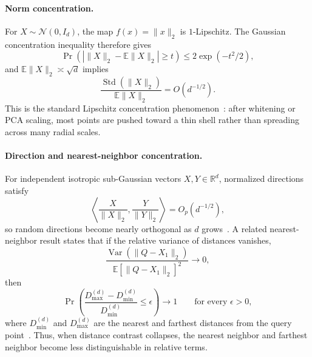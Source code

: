 \paragraph{Norm concentration.}
For \(X\sim\mathcal{N}(0,I_d)\), the map \(f(x)=\|x\|_2\) is \(1\)-Lipschitz. The Gaussian concentration inequality therefore gives
\begin{equation}
  \Pr\!\left(\left|\|X\|_2-\mathbb{E}\|X\|_2\right|\ge t\right)
  \le 2\exp(-t^2/2),
\end{equation}
and \(\mathbb{E}\|X\|_2\asymp \sqrt{d}\) implies
\begin{equation}
  \frac{\operatorname{Std}(\|X\|_2)}{\mathbb{E}\|X\|_2}
  = O(d^{-1/2}).
\end{equation}
This is the standard Lipschitz concentration phenomenon~\citep{ledoux2001concentration}: after whitening or PCA scaling, most points are pushed toward a thin shell rather than spreading across many radial scales.

\paragraph{Direction and nearest-neighbor concentration.}
For independent isotropic sub-Gaussian vectors \(X,Y\in\mathbb{R}^d\), normalized directions satisfy
\begin{equation}
  \left\langle \frac{X}{\|X\|_2},\frac{Y}{\|Y\|_2}\right\rangle
  = O_p(d^{-1/2}),
\end{equation}
so random directions become nearly orthogonal as \(d\) grows~\citep{vershynin2018high}. A related nearest-neighbor result states that if the relative variance of distances vanishes,
\begin{equation}
  \frac{\operatorname{Var}(\|Q-X_1\|_2)}
       {\mathbb{E}[\|Q-X_1\|_2]^2}
  \to 0,
\end{equation}
then
\begin{equation}
  \Pr\!\left(
  \frac{D_{\max}^{(d)}-D_{\min}^{(d)}}{D_{\min}^{(d)}}\le \epsilon
  \right)\to 1
  \qquad \text{for every }\epsilon>0,
\end{equation}
where \(D_{\min}^{(d)}\) and \(D_{\max}^{(d)}\) are the nearest and farthest distances from the query point~\citep{beyer1999nearest}. Thus, when distance contrast collapses, the nearest neighbor and farthest neighbor become less distinguishable in relative terms.

